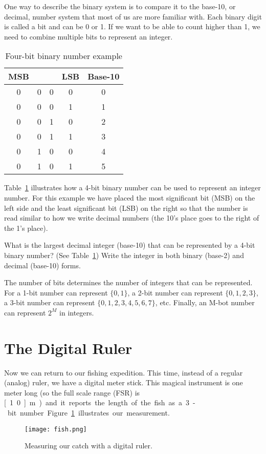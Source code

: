 One way to describe the binary system is to compare it to the base-10, or decimal, number system that most of us are more familiar with.  Each binary digit is called a \gls{bit} and can be 0 or 1.  If we want to be able to count higher than 1, we need to combine multiple bits to represent an integer.

\begin{table}[bt!] 
\renewcommand{\arraystretch}{1.2}
\caption{Four-bit binary number example}
\label{t:binary}
\centering
\begin{tabular}{|c|c|c|c||c|}\hline
MSB & & & LSB & Base-10\\ \hline \hline
0 & 0 & 0 & 0 & 0 \\ \hline
0 & 0 & 0 & 1 & 1 \\ \hline
0 & 0 & 1 & 0 & 2 \\ \hline
0 & 0 & 1 & 1 & 3 \\ \hline
0 & 1 & 0 & 0 & 4 \\ \hline
0 & 1 & 0 & 1 & 5 \\ \hline
\end{tabular}
\end{table}

Table~\ref{t:binary} illustrates how a 4-bit binary number can be used to represent an integer number.  For this example we have placed the most significant bit (MSB) on the left side and the least significant bit (LSB) on the right so that the number is read similar to how we write decimal numbers (the 10's place goes to the right of the 1's place). 

\begin{ex}
What is the largest decimal integer (base-10) that can be represented by a 4-bit binary number?  (See Table~\ref{t:binary})  Write the integer in both binary (base-2) and decimal (base-10) forms.
\end{ex}

The number of bits determines the number of integers that can be represented.  For a 1-bit number can represent $\{0,1\}$, a 2-bit number can represent $\{0,1,2,3\}$, a 3-bit number can represent $\{0,1,2,3,4,5,6,7\}$, etc.  Finally, an M-bot number can represent $2^M$ in integers.  

\section{The Digital Ruler}
Now we can return to our fishing expedition.  This time, instead of a regular (analog) ruler, we have a digital meter stick.  This magical instrument is one meter long (so the full scale range (FSR) is \unit[1.0]{m}) and it reports the length of the fish as a 3-bit number.  Figure~\ref{f:fish} illustrates our measurement.
\begin{figure}[hbt!]
\centering
\texttt{[image: fish.png]}
\caption{Measuring our catch with a digital ruler.}
\label{f:fish}
\end{figure}

